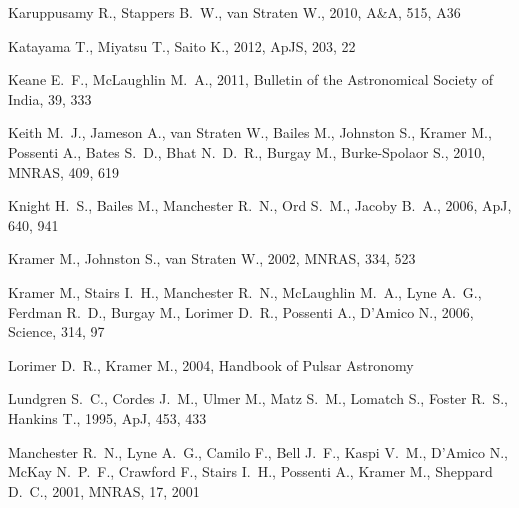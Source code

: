 \documentclass[fleqn,usenatbib]{mnras}
\begin{document}
\begin{thebibliography}{99}
{Karuppusamy} R., {Stappers} B.~W., {van Straten} W., 2010, A\&A, 515, A36

{Katayama} T., {Miyatsu} T., {Saito} K., 2012, ApJS, 203, 22

{Keane} E.~F., {McLaughlin} M.~A., 2011, Bulletin of the Astronomical Society of India, 39, 333

{Keith} M.~J., {Jameson} A., {van Straten} W., {Bailes} M., {Johnston} S., 
  {Kramer} M., {Possenti} A., {Bates} S.~D., {Bhat} N.~D.~R., {Burgay} M., 
  {Burke-Spolaor} S., 2010, MNRAS, 409, 619

{Knight} H.~S., {Bailes} M., {Manchester} R.~N., {Ord} S.~M., {Jacoby}
  B.~A., 2006, ApJ, 640, 941

{Kramer} M., {Johnston} S., {van Straten} W., 2002, MNRAS, 334, 523

{Kramer} M., {Stairs} I.~H., {Manchester} R.~N., {McLaughlin} M.~A., {Lyne}
  A.~G., {Ferdman} R.~D., {Burgay} M., {Lorimer} D.~R., {Possenti} A.,
  {D'Amico} N., 2006, Science, 314, 97

{Lorimer} D.~R., {Kramer} M., 2004, {Handbook of Pulsar Astronomy}

{Lundgren} S.~C., {Cordes} J.~M., {Ulmer} M., {Matz} S.~M., {Lomatch} S.,
  {Foster} R.~S., {Hankins} T., 1995, ApJ, 453, 433

{Manchester} R.~N., {Lyne} A.~G., {Camilo} F., {Bell} J.~F., {Kaspi} V.~M., 
  {D'Amico} N., {McKay} N.~P.~F., {Crawford} F., {Stairs} I.~H., {Possenti} A., 
  {Kramer} M., {Sheppard} D.~C., 2001, MNRAS, 17, 2001


\end{thebibliography}
\end{document}
